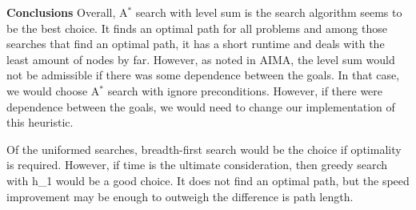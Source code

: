 \documentclass{article}
\begin{document}
{\Large \textbf{Conclusions}}
\vskip1pt
Overall, A$^*$ search with level sum is the search algorithm seems to be the best choice. It finds an optimal path for all problems and among those searches that find an optimal path, it has a short runtime and deals with the least amount of nodes by far. However, as noted in AIMA, the level sum would not be admissible if there was some dependence between the goals. In that case, we would choose A$^*$ search with ignore preconditions. However, if there were dependence between the goals, we would need to change our implementation of this heuristic.

Of the uniformed searches, breadth-first search would be the choice if optimality is required. However, if time is the ultimate consideration, then greedy search with h\_1 would be a good choice. It does not find an optimal path, but the speed improvement may be enough to outweigh the difference is path length.
\end{document}
